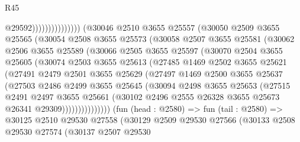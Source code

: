 \begin{lexlean}{R45}
\begin{coremodule}
                                      @29592)))))))))))))))
        (@30046
          @2510
          @3655
          @25557
          (@30050
            @2509
            @3655
            @25565
            (@30054
              @2508
              @3655
              @25573
              (@30058
                @2507
                @3655
                @25581
                (@30062
                  @2506
                  @3655
                  @25589
                  (@30066
                    @2505
                    @3655
                    @25597
                    (@30070
                      @2504
                      @3655
                      @25605
                      (@30074
                        @2503
                        @3655
                        @25613
                        (@27485
                          @1469
                          @2502
                          @3655
                          @25621
                          (@27491
                            @2479
                            @2501
                            @3655
                            @25629
                            (@27497
                              @1469
                              @2500
                              @3655
                              @25637
                              (@27503
                                @2486
                                @2499
                                @3655
                                @25645
                                (@30094
                                  @2498
                                  @3655
                                  @25653
                                  (@27515
                                    @2491
                                    @2497
                                    @3655
                                    @25661
                                    (@30102
                                      @2496
                                      @2555
                                      @26328
                                      @3655
                                      @25673
                                      @26341
                                      @29309)))))))))))))))
        (fun (head : @2580) =>
        fun (tail : @2580) =>
        @30125
          @2510
          @29530
          @27558
          (@30129
            @2509
            @29530
            @27566
            (@30133
              @2508
              @29530
              @27574
              (@30137
                @2507
                @29530

\end{coremodule}
\end{lexlean}
